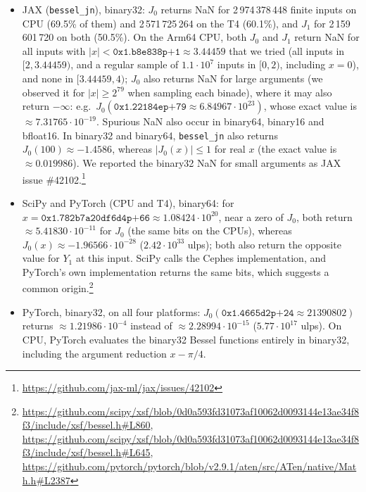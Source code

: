 \documentclass[11pt,a4paper]{article}
\begin{document}
\begin{itemize}
\item JAX (\texttt{bessel\_jn}), binary32: $J_0$ returns NaN for 2\,974\,378\,448 finite inputs on CPU (69.5\% of them) and 2\,571\,725\,264 on the T4 (60.1\%), and $J_1$ for 2\,159\,601\,720 on both (50.5\%). On the Arm64 CPU, both $J_0$ and $J_1$ return NaN for all inputs with $|x|<\texttt{0x1.b8e838p+1}\approx 3.44459$ that we tried (all inputs in $[2, 3.44459)$, and a regular sample of $1.1\cdot10^7$ inputs in $[0,2)$, including $x=0$), and none in $[3.44459, 4)$; $J_0$ also returns NaN for large arguments (we observed it for $|x|\ge 2^{79}$ when sampling each binade), where it may also return $-\infty$: e.g.\ $J_0(\texttt{0x1.22184ep+79}\approx 6.84967\cdot10^{23})$, whose exact value is $\approx 7.31765\cdot10^{-19}$. Spurious NaN also occur in binary64, binary16 and bfloat16. In binary32 and binary64, \texttt{bessel\_jn} also returns $J_0(100)\approx -1.4586$, whereas $|J_0(x)|\le 1$ for real $x$ (the exact value is $\approx 0.019986$). We reported the binary32 NaN for small arguments as JAX issue \#42102.\footnote{\url{https://github.com/jax-ml/jax/issues/42102}}
\item SciPy and PyTorch (CPU and T4), binary64: for $x=\texttt{0x1.782b7a20df6d4p+66}\approx 1.08424\cdot10^{20}$, near a zero of $J_0$, both return $\approx 5.41830\cdot10^{-11}$ for $J_0$ (the same bits on the CPUs), whereas $J_0(x)\approx -1.96566\cdot10^{-28}$ ($2.42\cdot10^{33}$ ulps); both also return the opposite value for $Y_1$ at this input. SciPy calls the Cephes implementation, and PyTorch's own implementation returns the same bits, which suggests a common origin.\footnote{\url{https://github.com/scipy/xsf/blob/0d0a593fd31073af10062d0093144e13ae34f8f3/include/xsf/bessel.h\#L860}, \url{https://github.com/scipy/xsf/blob/0d0a593fd31073af10062d0093144e13ae34f8f3/include/xsf/bessel.h\#L645}, \url{https://github.com/pytorch/pytorch/blob/v2.9.1/aten/src/ATen/native/Math.h\#L2387}}
\item PyTorch, binary32, on all four platforms: $J_0(\texttt{0x1.4665d2p+24}\approx 21390802)$ returns $\approx 1.21986\cdot10^{-4}$ instead of $\approx 2.28994\cdot10^{-15}$ ($5.77\cdot10^{17}$ ulps). On CPU, PyTorch evaluates the binary32 Bessel functions entirely in binary32, including the argument reduction $x-\pi/4$.
\end{itemize}
\end{document}
